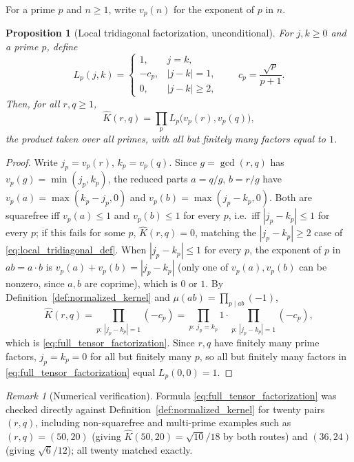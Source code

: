 \documentclass[11pt]{amsart}
\numberwithin{equation}{section}
\theoremstyle{plain}
\newtheorem{proposition}[theorem]{Proposition}
\theoremstyle{definition}
\theoremstyle{remark}
\newtheorem{remark}[theorem]{Remark}
\newcommand{\mob}{\mu}
\begin{document}
For a prime \(p\) and \(n\ge1\), write \(v_p(n)\) for the exponent of \(p\) in \(n\).

\begin{proposition}[Local tridiagonal factorization, unconditional]
\label{prop:local_tridiagonal}
For \(j,k\ge0\) and a prime \(p\), define
\begin{equation}
L_p(j,k)=
\begin{cases}
1, & j=k,\\
-c_p, & |j-k|=1,\\
0, & |j-k|\ge2,
\end{cases}
\qquad c_p=\frac{\sqrt p}{p+1}.
\label{eq:local_tridiagonal_def}
\end{equation}
Then, for all \(r,q\ge1\),
\begin{equation}
\widehat K(r,q)=\prod_{p}L_p\bigl(v_p(r),v_p(q)\bigr),
\label{eq:full_tensor_factorization}
\end{equation}
the product taken over all primes, with all but finitely many factors equal to \(1\).
\end{proposition}

\begin{proof}
Write \(j_p=v_p(r)\), \(k_p=v_p(q)\).  Since \(g=\gcd(r,q)\) has \(v_p(g)=\min(j_p,k_p)\), the reduced parts \(a=q/g\), \(b=r/g\) have \(v_p(a)=\max(k_p-j_p,0)\) and \(v_p(b)=\max(j_p-k_p,0)\).  Both are squarefree iff \(v_p(a)\le1\) and \(v_p(b)\le1\) for every \(p\), i.e.\ iff \(|j_p-k_p|\le1\) for every \(p\); if this fails for some \(p\), \(\widehat K(r,q)=0\), matching the \(|j_p-k_p|\ge2\) case of \eqref{eq:local_tridiagonal_def}.  When \(|j_p-k_p|\le1\) for every \(p\), the exponent of \(p\) in \(ab=a\cdot b\) is \(v_p(a)+v_p(b)=|j_p-k_p|\) (only one of \(v_p(a),v_p(b)\) can be nonzero, since \(a,b\) are coprime), which is \(0\) or \(1\).  By Definition~\ref{def:normalized_kernel} and \(\mob(ab)=\prod_{p\mid ab}(-1)\),
\begin{equation}
\widehat K(r,q)=\prod_{p:\,|j_p-k_p|=1}(-c_p)=\prod_{p:\,j_p=k_p}1\cdot\prod_{p:\,|j_p-k_p|=1}(-c_p),
\end{equation}
which is \eqref{eq:full_tensor_factorization}.  Since \(r,q\) have finitely many prime factors, \(j_p=k_p=0\) for all but finitely many \(p\), so all but finitely many factors in \eqref{eq:full_tensor_factorization} equal \(L_p(0,0)=1\).
\end{proof}

\begin{remark}[Numerical verification]
\label{rem:local_tridiagonal_numeric}
Formula \eqref{eq:full_tensor_factorization} was checked directly against Definition~\ref{def:normalized_kernel} for twenty pairs \((r,q)\), including non-squarefree and multi-prime examples such as \((r,q)=(50,20)\) (giving \(\widehat K(50,20)=\sqrt{10}/18\) by both routes) and \((36,24)\) (giving \(\sqrt6/12\)); all twenty matched exactly.
\end{remark}
\end{document}
